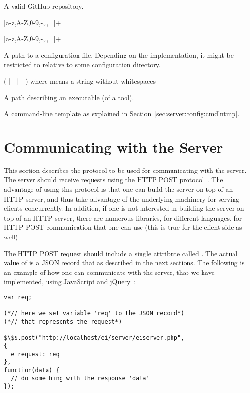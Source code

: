 A valid GitHub repository.

\bigskip
\noindent
{}

[a-z,A-Z,0-9,-,.,\_]+

\bigskip
\noindent
{}

[a-z,A-Z,0-9,-,.,\_]+

\bigskip
\noindent
{}

A path to a configuration file. Depending on the implementation, it
might be restricted to relative to some configuration directory.

\bigskip
\noindent
{}

(  |  |  |  |  )
where  means a string without whitespaces




\bigskip
\noindent
{}

A path describing an executable (of a tool).

\bigskip
\noindent
{}

A command-line template as explained in
Section~\ref{sec:server:config:cmdlntmp}.

\section{Communicating with the \ei Server}
\label{sec:server:access}

This section describes the protocol to be used for communicating with
the \ei server. The server should receive requests using the HTTP POST
protocol~\cite{rfc2616}. The advantage of using this protocol is that one can
build the \ei server on top of an HTTP server, and thus take advantage
of the underlying machinery for serving clients concurrently.
%
In addition, if one is not interested in building the \ei server on
top of an HTTP server, there are numerous libraries, for different
languages, for HTTP POST communication that one can use (this is true
for the client side as well).


The HTTP POST request should include a single attribute called
. The actual value of  is a JSON record
that as described in the next sections.
%
The following is an example of how one can communicate with the
server, that we have implemented, using JavaScript and
jQuery~\cite{jquery}:

\medskip
\begin{lstlisting}
var req;

(*// here we set variable 'req' to the JSON record*)
(*// that represents the request*)

$\$$.post("http://localhost/ei/server/eiserver.php",
{
  eirequest: req
},
function(data) { 
  // do something with the response 'data'
});
\end{lstlisting}

